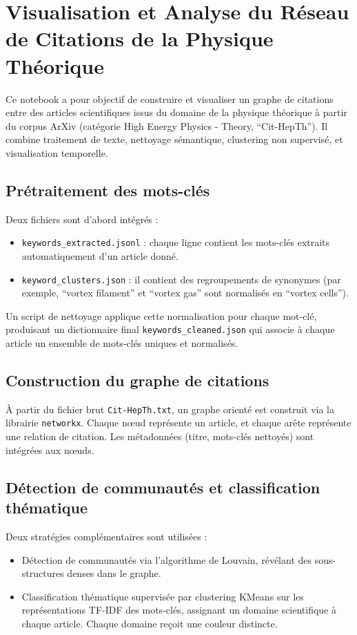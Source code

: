 \documentclass[12pt]{article}
\begin{document}
\section{Visualisation et Analyse du Réseau de Citations de la Physique Théorique}

Ce notebook a pour objectif de construire et visualiser un graphe de citations entre des articles scientifiques issus du domaine de la physique théorique à partir du corpus ArXiv (catégorie High Energy Physics - Theory, ``Cit-HepTh''). Il combine traitement de texte, nettoyage sémantique, clustering non supervisé, et visualisation temporelle.

\subsection{Prétraitement des mots-clés}

Deux fichiers sont d'abord intégrés :
\begin{itemize}
    \item \texttt{keywords\_extracted.jsonl} : chaque ligne contient les mots-clés extraits automatiquement d'un article donné.
    \item \texttt{keyword\_clusters.json} : il contient des regroupements de synonymes (par exemple, ``vortex filament'' et ``vortex gas'' sont normalisés en ``vortex cells'').
\end{itemize}

Un script de nettoyage applique cette normalisation pour chaque mot-clé, produisant un dictionnaire final \texttt{keywords\_cleaned.json} qui associe à chaque article un ensemble de mots-clés uniques et normalisés.

\subsection{Construction du graphe de citations}

À partir du fichier brut \texttt{Cit-HepTh.txt}, un graphe orienté est construit via la librairie \texttt{networkx}. Chaque nœud représente un article, et chaque arête représente une relation de citation. Les métadonnées (titre, mots-clés nettoyés) sont intégrées aux nœuds.

\subsection{Détection de communautés et classification thématique}

Deux stratégies complémentaires sont utilisées :
\begin{itemize}
    \item Détection de communautés via l'algorithme de Louvain, révélant des sous-structures denses dans le graphe.
    \item Classification thématique supervisée par clustering KMeans sur les représentations TF-IDF des mots-clés, assignant un domaine scientifique à chaque article. Chaque domaine reçoit une couleur distincte.
\end{itemize}
\end{document}
